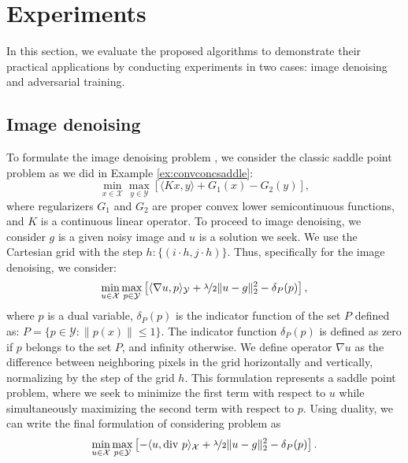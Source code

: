 \documentclass{article}
\begin{document}
\section{Experiments}
\label{sec:experiments}
In this section, we evaluate the proposed algorithms to demonstrate their practical applications by conducting experiments in two cases: image denoising and adversarial training.

\subsection{Image denoising} 

To formulate the image denoising problem \citep{chambolle2011first}, we consider the classic saddle point problem as we did in Example \ref{ex:convconcsaddle}:
$$
\min_{x \in \mathcal{X}} \max_{y \in \mathcal{Y}} \left[\langle Kx, y \rangle + G_1(x) - G_2(y)\right],
$$
where regularizers \(G_1\) and \(G_2\) are proper convex lower semicontinuous functions, and \(K\) is a continuous linear operator. To proceed to image denoising, we consider $g$ is a given noisy image and $u$ is a solution we seek. We use the Cartesian grid with the step $h: \{(i\cdot h, j\cdot h)\}$. Thus, specifically for the image denoising, we consider:
$$
\min_{u \in \mathcal{X}} \max_{p \in \mathcal{Y}} \left[\langle \nabla u, p \rangle_{\mathcal{Y}} + \nicefrac{\lambda}{2} \|u - g\|^2_2 - \delta_{P}(p)\right],
$$
where $p$ is a dual variable, \(\delta_{P}(p)\) is the indicator function of the set \(P\) defined as: $ P = \{ p \in \mathcal{Y} : \| p(x) \| \leq 1 \}.$ The indicator function \(\delta_P(p)\) is defined as zero if \(p\) belongs to the set \(P\), and infinity otherwise. We define operator $\nabla u$ as the difference between neighboring pixels in the grid horizontally and vertically, normalizing by the step of the grid $h$. This formulation represents a saddle point problem, where we seek to minimize the first term with respect to \(u\) while simultaneously maximizing the second term with respect to \(p\). Using duality, we can write the final formulation of considering problem as
\begin{equation} \label{problem_denoising}
\min_{u \in \mathcal{X}} \max_{p \in \mathcal{Y}} \left[-\langle u, \text{div} ~p \rangle_{\mathcal{X}} + \nicefrac{\lambda}{2} \|u - g\|^2_2 - \delta_{P}(p)\right].
\end{equation}
\vspace{-2mm}

\end{document}
